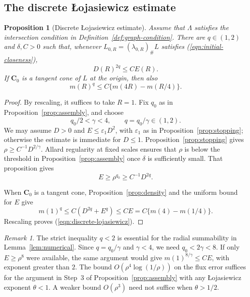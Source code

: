 \documentclass[11pt,a4paper]{article}
\numberwithin{equation}{section}
\newtheorem{proposition}[theorem]{Proposition}
\theoremstyle{definition}
\theoremstyle{remark}
\newtheorem*{remark*}{Remark}
\begin{document}
	
	\subsection{The discrete \L{}ojasiewicz estimate}
	
	\begin{proposition}[Discrete \L{}ojasiewicz estimate]
		\label{prop:discrete-lojasiewicz}
		Assume that $\Lambda$ satisfies the intersection condition in
		Definition~\ref{def:graph-condition}.
		There are $q\in(1,2)$ and $\delta,C>0$ such that, whenever
		$L_{0,R}=(\lambda_{0,R})_\#L$ satisfies (\ref{eqn:initial-closeness}),
		\[
		D(R)^{2q}\le CE(R).
		\]
		If $\mathbf C_0$ is a tangent cone of $L$ at the origin, then also
		\begin{equation}\label{eqn:discrete-lojasiewicz}
			m(R)^q\le C\{m(4R)-m(R/4)\}.
		\end{equation}
	\end{proposition}
	
	\begin{proof}
		By rescaling, it suffices to take $R=1$.
		Fix $q_0$ as in Proposition~\ref{prop:assembly}, and choose
		\[
		q_0/2<\gamma<4,\qquad q=q_0/\gamma\in(1,2).
		\]
		We may assume $D>0$ and $E\le\varepsilon_1D^2$, with $\varepsilon_1$
		as in Proposition~\ref{prop:stopping}; otherwise the estimate is immediate
		for $D\le1$.
		Proposition~\ref{prop:stopping} gives $\rho\ge C^{-1}D^{2/\gamma}$.
		Allard regularity at fixed scales ensures that $\rho$ is below the
		threshold in Proposition~\ref{prop:assembly} once $\delta$ is sufficiently small.
		That proposition gives
		\[
		E\ge\rho^{q_0}\ge C^{-1}D^{2q}.
		\]
		
		When $\mathbf C_0$ is a tangent cone, Proposition~\ref{prop:density}
		and the uniform bound for $E$ give
		\[
		m(1)^q\le C(D^{2q}+E^q)\le CE
		=C\{m(4)-m(1/4)\}.
		\]
		Rescaling proves (\ref{eqn:discrete-lojasiewicz}).
	\end{proof}
	
	\begin{remark*}
		The strict inequality $q<2$ is essential for the radial summability
		in Lemma~\ref{lem:numerical}. Since $q=q_0/\gamma$ and $\gamma<4$,
		we need $q_0<2\gamma<8$. If only $E\ge\rho^8$ were available,
		the same argument would give $m(1)^{8/\gamma}\le CE$, with exponent
		greater than $2$. The bound $O(\rho^4\log(1/\rho))$ on the flux error
		suffices for the argument in Step~3 of Proposition~\ref{prop:assembly}
		with any \L{}ojasiewicz exponent $\theta<1$. A weaker bound $O(\rho^3)$ need not suffice when $\theta>1/2$.
	\end{remark*}
	
\end{document}
